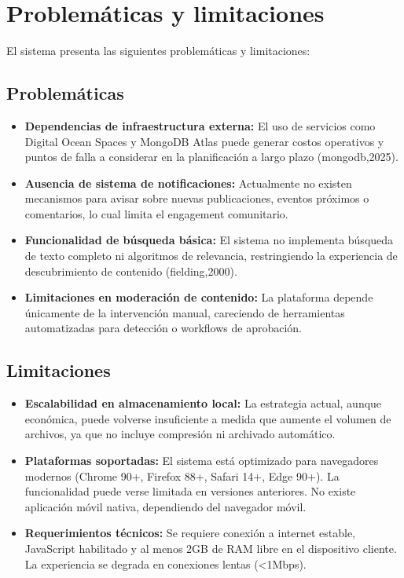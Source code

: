 \section{Problemáticas y limitaciones}
El sistema presenta las siguientes problemáticas y limitaciones:

\subsection*{Problemáticas}
\begin{itemize}
     \item \textbf{Dependencias de infraestructura externa:} El uso de servicios como Digital Ocean Spaces y MongoDB Atlas puede generar costos operativos y puntos de falla a considerar en la planificación a largo plazo (mongodb,2025).
    
    \item \textbf{Ausencia de sistema de notificaciones:} Actualmente no existen mecanismos para avisar sobre nuevas publicaciones, eventos próximos o comentarios, lo cual limita el engagement comunitario.
    \item \textbf{Funcionalidad de búsqueda básica:} El sistema no implementa búsqueda de texto completo ni algoritmos de relevancia, restringiendo la experiencia de descubrimiento de contenido (fielding,2000).
    \item \textbf{Limitaciones en moderación de contenido:} La plataforma depende únicamente de la intervención manual, careciendo de herramientas automatizadas para detección o workflows de aprobación.
\end{itemize}

\subsection*{Limitaciones}
\begin{itemize}
    \item \textbf{Escalabilidad en almacenamiento local:} La estrategia actual, aunque económica, puede volverse insuficiente a medida que aumente el volumen de archivos, ya que no incluye compresión ni archivado automático.
    \item \textbf{Plataformas soportadas:} El sistema está optimizado para navegadores modernos (Chrome 90+, Firefox 88+, Safari 14+, Edge 90+). La funcionalidad puede verse limitada en versiones anteriores. No existe aplicación móvil nativa, dependiendo del navegador móvil.
    \item \textbf{Requerimientos técnicos:} Se requiere conexión a internet estable, JavaScript habilitado y al menos 2GB de RAM libre en el dispositivo cliente. La experiencia se degrada en conexiones lentas (<1Mbps).
\end{itemize}

